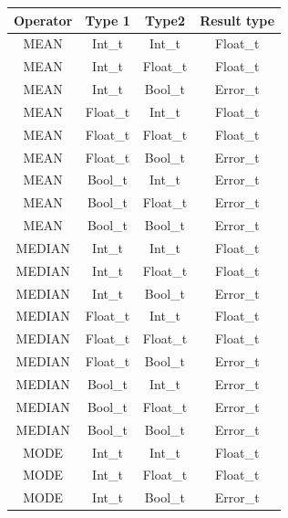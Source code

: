 \begin{figure}[H]
    \centering
    \begin{tabular}{cccc}
        \toprule
        \textbf{Operator} & \textbf{Type 1} & \textbf{Type2} & \textbf{Result type}\\
        \midrule MEAN & Int\_t & Int\_t      & Float\_t \\
        \midrule MEAN & Int\_t & Float\_t    & Float\_t \\
        \midrule MEAN & Int\_t & Bool\_t     & Error\_t \\

        \midrule MEAN & Float\_t & Int\_t    & Float\_t \\
        \midrule MEAN & Float\_t & Float\_t  & Float\_t \\
        \midrule MEAN & Float\_t & Bool\_t   & Error\_t \\

        \midrule MEAN & Bool\_t & Int\_t     & Error\_t \\
        \midrule MEAN & Bool\_t & Float\_t   & Error\_t \\
        \midrule MEAN & Bool\_t & Bool\_t    & Error\_t \\

        \midrule MEDIAN & Int\_t & Int\_t      & Float\_t \\
        \midrule MEDIAN & Int\_t & Float\_t    & Float\_t \\
        \midrule MEDIAN & Int\_t & Bool\_t     & Error\_t \\

        \midrule MEDIAN & Float\_t & Int\_t    & Float\_t \\
        \midrule MEDIAN & Float\_t & Float\_t  & Float\_t \\
        \midrule MEDIAN & Float\_t & Bool\_t   & Error\_t \\

        \midrule MEDIAN & Bool\_t & Int\_t     & Error\_t \\
        \midrule MEDIAN & Bool\_t & Float\_t   & Error\_t \\
        \midrule MEDIAN & Bool\_t & Bool\_t    & Error\_t \\

        \midrule MODE & Int\_t & Int\_t      & Float\_t \\
        \midrule MODE & Int\_t & Float\_t    & Float\_t \\
        \midrule MODE & Int\_t & Bool\_t     & Error\_t \\


\end{tabular}
\end{figure}
